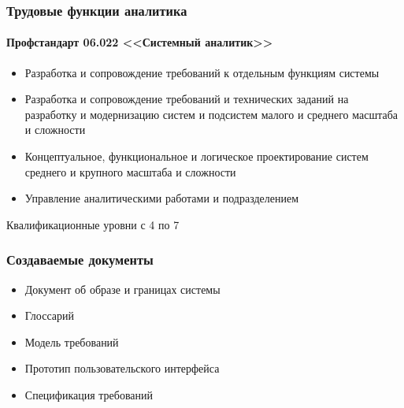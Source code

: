 \documentclass{../../slides-style}
\begin{document}
    \begin{frame}
        \frametitle{Трудовые функции аналитика}
        \framesubtitle{Профстандарт 06.022 <<Системный аналитик>>}
        \begin{itemize}
            \item Разработка и сопровождение требований к отдельным функциям системы
            \item Разработка и сопровождение требований и технических заданий на разработку и модернизацию систем и подсистем малого и среднего масштаба и сложности
            \item Концептуальное, функциональное и логическое проектирование систем среднего и крупного масштаба и сложности
            \item Управление аналитическими работами и подразделением
        \end{itemize}
        Квалификационные уровни с 4 по 7
    \end{frame}

    \begin{frame}
        \frametitle{Создаваемые документы}
        \begin{itemize}
            \item Документ об образе и границах системы
            \item Глоссарий
            \item Модель требований
            \item Прототип пользовательского интерфейса
            \item Спецификация требований
        \end{itemize}
    \end{frame}
\end{document}
